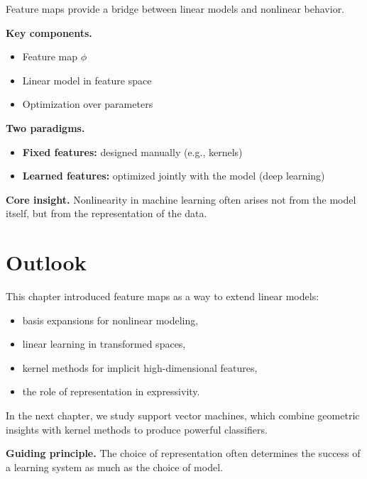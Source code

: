Feature maps provide a bridge between linear models and nonlinear behavior.

\medskip

\noindent
\textbf{Key components.}
\begin{itemize}
    \item Feature map $\phi$
    \item Linear model in feature space
    \item Optimization over parameters
\end{itemize}

\medskip

\noindent
\textbf{Two paradigms.}
\begin{itemize}
    \item \textbf{Fixed features:} designed manually (e.g., kernels)
    \item \textbf{Learned features:} optimized jointly with the model (deep learning)
\end{itemize}

\medskip

\noindent
\textbf{Core insight.}  
Nonlinearity in machine learning often arises not from the model itself, but from the representation of the data.

\section{Outlook}

This chapter introduced feature maps as a way to extend linear models:
\begin{itemize}
    \item basis expansions for nonlinear modeling,
    \item linear learning in transformed spaces,
    \item kernel methods for implicit high-dimensional features,
    \item the role of representation in expressivity.
\end{itemize}

\medskip

In the next chapter, we study support vector machines, which combine geometric insights with kernel methods to produce powerful classifiers.

\medskip

\noindent
\textbf{Guiding principle.}  
The choice of representation often determines the success of a learning system as much as the choice of model.